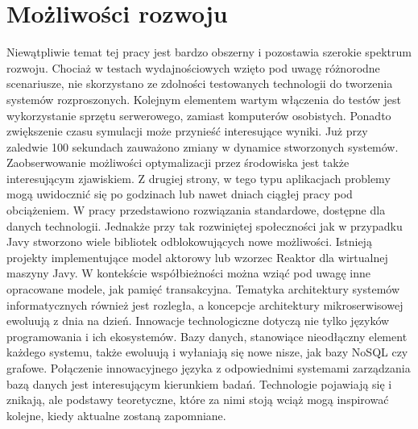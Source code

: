 \documentclass[12pt,twoside]{article}
\begin{document}
\section{Możliwości rozwoju}\label{moux17cliwoux15bci-rozwoju}

Niewątpliwie temat tej pracy jest bardzo obszerny i pozostawia szerokie
spektrum rozwoju. Chociaż w testach wydajnościowych wzięto pod uwagę
różnorodne scenariusze, nie skorzystano ze zdolności testowanych
technologii do tworzenia systemów rozproszonych. Kolejnym elementem
wartym włączenia do testów jest wykorzystanie sprzętu serwerowego,
zamiast komputerów osobistych. Ponadto zwiększenie czasu symulacji może
przynieść interesujące wyniki. Już przy zaledwie 100 sekundach zauważono
zmiany w dynamice stworzonych systemów. Zaobserwowanie możliwości
optymalizacji przez środowiska jest także interesującym zjawiskiem. Z
drugiej strony, w tego typu aplikacjach problemy mogą uwidocznić się po
godzinach lub nawet dniach ciągłej pracy pod obciążeniem. W pracy
przedstawiono rozwiązania standardowe, dostępne dla danych technologii.
Jednakże przy tak rozwiniętej społeczności jak w przypadku Javy
stworzono wiele bibliotek odblokowujących nowe możliwości. Istnieją
projekty implementujące model aktorowy lub wzorzec Reaktor dla
wirtualnej maszyny Javy. W kontekście współbieżności można wziąć pod
uwagę inne opracowane modele, jak pamięć transakcyjna. Tematyka
architektury systemów informatycznych również jest rozległa, a koncepcje
architektury mikroserwisowej ewoluują z dnia na dzień. Innowacje
technologiczne dotyczą nie tylko języków programowania i ich
ekosystemów. Bazy danych, stanowiące nieodłączny element każdego
systemu, także ewoluują i wyłaniają się nowe nisze, jak bazy NoSQL czy
grafowe. Połączenie innowacyjnego języka z odpowiednimi systemami
zarządzania bazą danych jest interesującym kierunkiem badań. Technologie
pojawiają się i znikają, ale podstawy teoretyczne, które za nimi stoją
wciąż mogą inspirować kolejne, kiedy aktualne zostaną zapomniane.
\clearpage{}

\underline{}
\printbibliography
\end{document}
